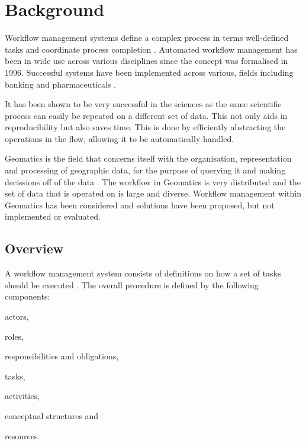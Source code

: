 \chapter{Background\label{chap1}}
    Workflow management systems define a complex process in terms well-defined
    tasks and coordinate process completion \cite{1245778}.  Automated
    workflow management has been in wide use across various disciplines since
    the concept was formalised in 1996\cite{springerlink:10.1007/BF00136712}.
    Successful systems have been implemented across various, fields including
    banking and pharmaceuticals
    \cite{Brahe:2007:SWW:1316624.1316661,5407993}.

    It has been shown to be very successful in the sciences as the same scientific
    process can easily be repeated on a different set of data\cite{4721191}.
    This not only aids in reproducibility but also saves time.  This is done by
    efficiently abstracting the operations in the flow, allowing it to be
    automatically handled.

    Geomatics is the field that concerns itself with the organisation,
    representation and processing of geographic data, for the purpose of
    querying it and making decissions off of the data
    \cite{DiMartino:2007:TAG:1341012.1341081}. The workflow in Geomatics is
    very distributed and the set of data that is operated on is large and
    diverse.  Workflow management within Geomatics has been considered and
    solutions have been proposed, but not implemented or
    evaluated\cite{Migliorini:2011:WTG:1999320.1999356}.


\section{Overview}
A workflow management system consists of definitions on how a set of tasks
should be executed \cite{springerlink:10.1007/BF00136712,vanderAalst2002125}.
The overall procedure is defined by the following components:
\begin{inparaenum}[(i)] \item actors, \item roles, \item responsibilities and
obligations, \item tasks, \item activities,\item conceptual structures and
\item resources.\end{inparaenum}


